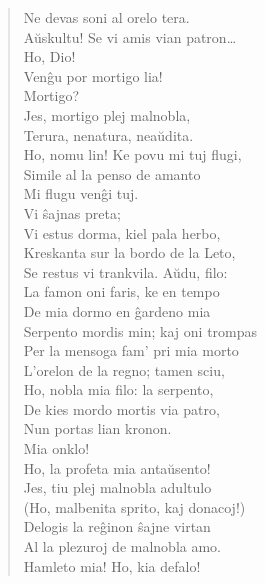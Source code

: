 \begin{verse}
                Ne devas soni al orelo tera.\\
                A\u uskultu! Se vi amis vian patron\dots\\
 Ho, Dio!\\
 Ven\^gu por mortigo lia!\\
 Mortigo?\\
 Jes, mortigo plej malnobla,\\
                Terura, nenatura, nea\u udita.\\
 Ho, nomu lin! Ke povu mi tuj flugi,\\
                Simile al la penso de amanto\\
                Mi flugu ven\^gi tuj.\\
 Vi \^sajnas preta;\\
                Vi estus dorma, kiel pala herbo,\\
                Kreskanta sur la bordo de la Leto,\\
                Se restus vi trankvila. A\u udu, filo:\\
                La famon oni faris, ke en tempo\\
                De mia dormo en \^gardeno mia\\
                Serpento mordis min; kaj oni trompas\\
                Per la mensoga fam' pri mia morto\\
                L'orelon de la regno; tamen sciu,\\
                Ho, nobla mia filo: la serpento,\\
                De kies mordo mortis via patro,\\
                Nun portas lian kronon.\\
 Mia onklo!\\
                Ho, la profeta mia anta\u usento!\\
 Jes, tiu plej malnobla adultulo\\
                (Ho, malbenita sprito, kaj donacoj!)\\
                Delogis la reĝinon \^sajne virtan\\
                Al la plezuroj de malnobla amo.\\
                Hamleto mia! Ho, kia defalo!\\

\end{verse}
